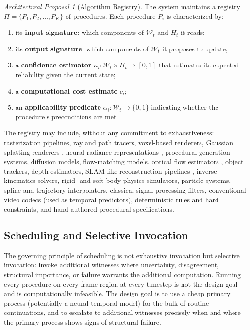 \documentclass[12pt,a4paper]{article}
\theoremstyle{plain}
\theoremstyle{definition}
\theoremstyle{remark}
\newtheorem{proposal}[theorem]{Architectural Proposal}
\begin{document}
\begin{proposal}[Algorithm Registry]
\label{prop:registry}
The system maintains a registry $\Pi = \{P_1, P_2, \ldots, P_K\}$ of procedures. Each procedure $P_i$ is characterized by:
\begin{enumerate}[leftmargin=2em,itemsep=0pt]
\item its \textbf{input signature}: which components of $\mathcal{W}_t$ and $H_t$ it reads;
\item its \textbf{output signature}: which components of $\mathcal{W}_t$ it proposes to update;
\item a \textbf{confidence estimator} $\kappa_i : \mathcal{W}_t \times H_t \to [0,1]$ that estimates its expected reliability given the current state;
\item a \textbf{computational cost estimate} $c_i$;
\item an \textbf{applicability predicate} $\alpha_i : \mathcal{W}_t \to \{0,1\}$ indicating whether the procedure's preconditions are met.
\end{enumerate}
\end{proposal}

The registry may include, without any commitment to exhaustiveness: rasterization pipelines, ray and path tracers, voxel-based renderers, Gaussian splatting renderers \cite{kerbl2023gaussians}, neural radiance representations \cite{mildenhall2020nerf}, procedural generation systems, diffusion models, flow-matching models, optical flow estimators \cite{horn1981optical,lucas1981optical}, object trackers, depth estimators, SLAM-like reconstruction pipelines \cite{davison2007monoslam}, inverse kinematics solvers, rigid- and soft-body physics simulators, particle systems, spline and trajectory interpolators, classical signal processing filters, conventional video codecs (used as temporal predictors), deterministic rules and hard constraints, and hand-authored procedural specifications.

\subsection{Scheduling and Selective Invocation}

The governing principle of scheduling is not exhaustive invocation but selective invocation: invoke additional witnesses where uncertainty, disagreement, structural importance, or failure warrants the additional computation. Running every procedure on every frame region at every timestep is not the design goal and is computationally infeasible. The design goal is to use a cheap primary process (potentially a neural temporal model) for the bulk of routine continuations, and to escalate to additional witnesses precisely when and where the primary process shows signs of structural failure.
\end{document}
